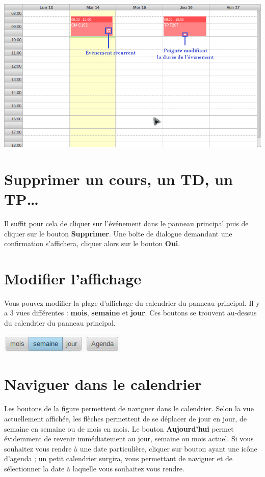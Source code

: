 \documentclass[a4paper, 11pt]{report}
\begin{document}
			\begin{center}
				\includegraphics[scale = 0.6]{modifier_evenement.png}
			\end{center}
		\section{Supprimer un cours, un TD, un TP…}
			Il suffit pour cela de cliquer sur l’événement dans le panneau principal puis de cliquer sur le bouton \textbf{Supprimer}. Une boîte de dialogue demandant une confirmation s’affichera, cliquer alors sur le bouton \textbf{Oui}.

		\section{Modifier l’affichage}
			Vous pouvez modifier la plage d’affichage du calendrier du panneau principal. Il y a 3 vues différentes : \textbf{mois}, \textbf{semaine} et \textbf{jour}. Ces boutons se trouvent au-dessus du calendrier du panneau principal.

			\begin{center}
				\includegraphics[scale = 1]{afficher_differentes_vues}
			\end{center}
		\section{Naviguer dans le calendrier}
			Les boutons de la figure permettent de naviguer dans le calendrier. Selon la vue actuellement affichée, les flèches permettent de se déplacer de jour en jour, de semaine en semaine ou de mois en mois. Le bouton \textbf{Aujourd’hui} permet évidemment de revenir immédiatement au jour, semaine ou mois actuel. Si vous souhaitez vous rendre à une date particulière, cliquer sur bouton ayant une icône d’agenda ; un petit calendrier surgira, vous permettant de naviguer et de sélectionner la date à laquelle vous souhaitez vous rendre.
\end{document}
